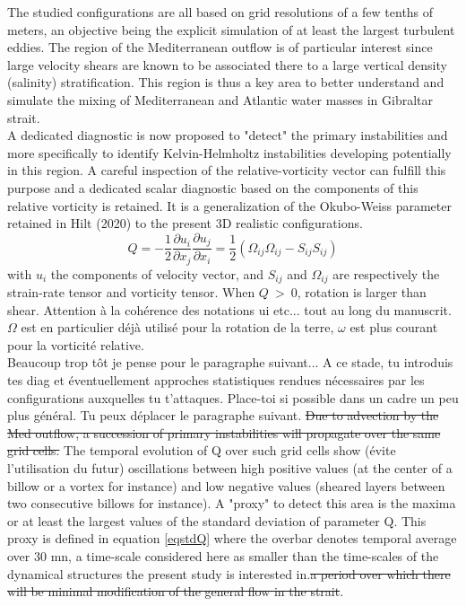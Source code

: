 \color{blue}The studied configurations are all based on grid resolutions of a few tenths of meters, an objective being the explicit simulation of at least the largest turbulent eddies. The region of the Mediterranean outflow is of particular interest since large velocity shears are known to be associated there to a large vertical density (salinity) stratification. This region is thus a key area to better understand and simulate the mixing of Mediterranean and Atlantic water masses in Gibraltar strait.\\
A dedicated diagnostic is now proposed to "detect" the primary instabilities and more specifically to identify Kelvin-Helmholtz instabilities developing potentially in this region. \color{black}
\color{blue} A careful inspection of the relative-vorticity vector can fulfill this purpose and a dedicated scalar diagnostic based on the components of this relative vorticity is retained. It is a generalization of the Okubo-Weiss parameter retained in Hilt (2020) to the present 3D realistic configurations. \color{black}
\begin{equation}
Q=-\frac{1}{2} \frac{\partial u_i}{\partial x_j} \frac{\partial u_j}{\partial x_i} = \frac{1}{2} (\Omega_{ij}\Omega_{ij} - S_{ij} S_{ij})
\end{equation}
with $u_i$ the components of velocity vector, and $S_{ij}$ and $\Omega_{ij}$ are respectively the strain-rate tensor and vorticity tensor. When $Q\ >\ 0$, rotation is larger than shear.
\color{green}Attention à la cohérence des notations ui etc... tout au long du manuscrit. $\Omega$ est en particulier déjà utilisé pour la rotation de la terre, $\omega$ est plus courant pour la vorticité relative.\color{black}\\

\color{green} Beaucoup trop tôt je pense pour le paragraphe suivant... A ce stade, tu introduis tes diag et éventuellement approches statistiques rendues nécessaires par les configurations auxquelles tu t'attaques. Place-toi si possible dans un cadre un peu plus général. Tu peux déplacer le paragraphe suivant. \color{black}
\sout{Due to advection by the Med outflow, a succession of primary instabilities \sout{will} propagate over the same grid cells.} The temporal evolution of Q over such grid cells show \color{green}(évite l'utilisation du futur) \color{blue} oscillations between high positive values (at the center of a billow or a vortex for instance) and low negative values (sheared layers between two consecutive billows for instance). A "proxy" to detect this area is the maxima or at least the largest values of the standard deviation of parameter Q. This proxy is defined in equation \ref{eqstdQ} where the overbar denotes temporal average over 30 mn, a time-scale considered here as smaller than the time-scales of the dynamical structures the present study is interested in.\sout{a period over which there will be minimal modification of the general flow in the strait}. \color{black}

